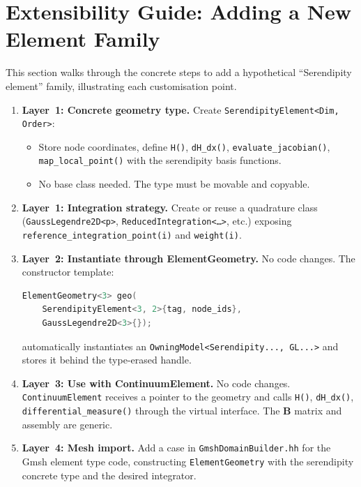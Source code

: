 \section{Extensibility Guide: Adding a New Element Family}
\label{sec:extensibility}

This section walks through the concrete steps to add a hypothetical
``Serendipity element'' family, illustrating each customisation point.

\begin{enumerate}
  \item \textbf{Layer~1: Concrete geometry type.}
    Create \texttt{SerendipityElement<Dim, Order>}:
    \begin{itemize}[nosep]
      \item Store node coordinates, define \texttt{H()}, \texttt{dH\_dx()},
            \texttt{evaluate\_jacobian()}, \texttt{map\_local\_point()} with
            the serendipity basis functions.
      \item No base class needed.  The type must be movable and copyable.
    \end{itemize}

  \item \textbf{Layer~1: Integration strategy.}
    Create or reuse a quadrature class (\texttt{GaussLegendre2D<p>},
    \texttt{ReducedIntegration<\ldots>}, etc.) exposing
    \texttt{reference\_integration\_point(i)} and \texttt{weight(i)}.

  \item \textbf{Layer~2: Instantiate through ElementGeometry.}
    No code changes.  The constructor template:
\begin{lstlisting}[language=C++]
ElementGeometry<3> geo(
    SerendipityElement<3, 2>{tag, node_ids},
    GaussLegendre2D<3>{});
\end{lstlisting}
    automatically instantiates an
    \texttt{OwningModel<Serendipity..., GL...>} and stores it behind the
    type-erased handle.

  \item \textbf{Layer~3: Use with ContinuumElement.}
    No code changes.  \texttt{ContinuumElement} receives a pointer to the
    geometry and calls \texttt{H()}, \texttt{dH\_dx()},
    \texttt{differential\_measure()} through the virtual interface.  The
    $\mathbf{B}$ matrix and assembly are generic.

  \item \textbf{Layer~4: Mesh import.}
    Add a case in \texttt{GmshDomainBuilder.hh} for the Gmsh element type
    code, constructing \texttt{ElementGeometry} with the serendipity concrete
    type and the desired integrator.


\end{enumerate}
